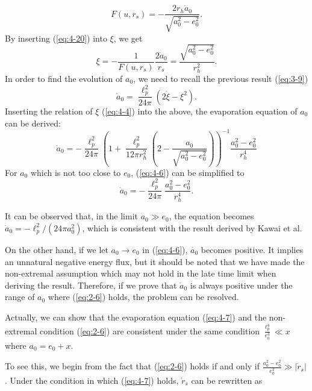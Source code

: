 \documentclass[letterpaper,12pt]{article}
\begin{document}
\begin{equation}\label{eq:4-20}
F(u, r_{s}) = -\frac{2r_{h}\dot{a}_{0}}{\sqrt{a_{0}^{2}-e_{0}^{2}}}.
\end{equation}
By inserting (\ref{eq:4-20}) into $\xi$, we get
\begin{equation}\label{eq:4-4}
\xi=-\frac{1}{F(u,r_{s})}\frac{2\dot a_{0}}{r_{s}}=\frac{\sqrt{a_{0}^{2}-e_{0}^{2}}}{r_{h}^{2}}.
\end{equation}
In order to find the evolution of $a_{0}$, we need to recall the previous result (\ref{eq:3-9})
\begin{equation}\label{eq:4-5}
\dot{a}_{0} = \frac{\ell_{p}^{2}}{24\pi}(2\dot{\xi}-\xi^{2}).
\end{equation}
Inserting the relation of $\xi$ (\ref{eq:4-4}) into the above, the evaporation equation of $a_{0}$ can be derived:
\begin{equation}\label{eq:4-6}
\dot{a}_{0} =-\frac{\ell_{p}^{2}}{24\pi}\left(
1+\frac{\ell^{2}_{p}}{12\pi r_{h}^{2}}\left(2-\frac{a_{0}}{\sqrt{a_{0}^{2}-e_{0}^{2}}}\right)\right)^{-1}\frac{a_{0}^{2}-e_{0}^{2}}{r_{h}^{4}}
\end{equation}
For $a_{0}$ which is not too close to $e_{0}$, (\ref{eq:4-6}) can be simplified to
\begin{equation}\label{eq:4-7}
\dot{a}_{0} =-\frac{\ell_{p}^{2}}{24\pi}\frac{a_{0}^{2}-e_{0}^{2}}{r_{h}^{4}}.
\end{equation}

It can be observed that, in the limit $a_{0} \gg e_{0}$, the equation becomes $\dot{a}_{0} = -\ell_{p}^{2}/(24\pi a_{0}^{2})$, which is consistent with the result derived by Kawai et al.\cite{kawai2013self}

On the other hand, if we let $a_{0} \rightarrow e_{0}$ in (\ref{eq:4-6}), $\dot{a_{0}}$ becomes positive. It implies an unnatural negative energy flux, but it should be noted that we have made the non-extremal assumption which may not hold in the late time limit when deriving the result. Therefore, if we prove that $\dot{a}_{0}$ is always positive under the range of $a_{0}$ where (\ref{eq:2-6}) holds, the problem can be resolved.

Actually, we can show that the evaporation equation (\ref{eq:4-7}) and the non-extremal condition (\ref{eq:2-6}) are consistent under the same condition $\frac{\ell_{p}^{4}}{e_{0}^{3}} \ll x$ where $a_{0} = e_{0}+ x$.

To see this, we begin from the fact that (\ref{eq:2-6}) holds if and only if  $\frac{a_{0}^2-e_{0}^2}{e_{0}^2} \gg |\dot{r}_{s}|$. Under the condition in which (\ref{eq:4-7}) holds, $\dot{r}_{s}$ can be rewritten as
\end{document}
